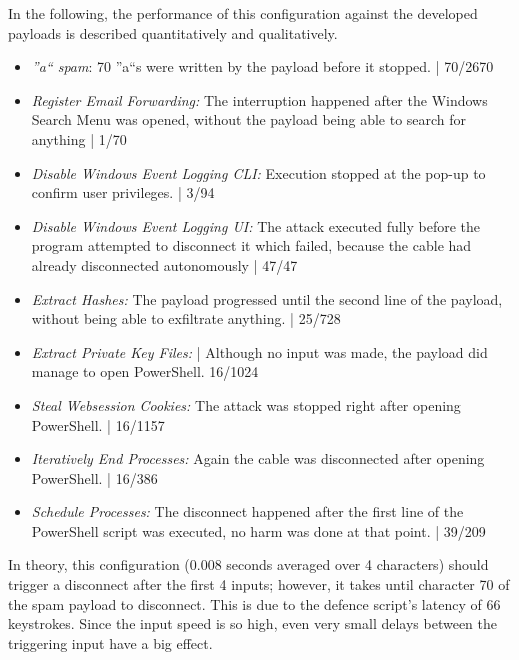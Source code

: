 In the following, the performance of this configuration against the developed payloads is described quantitatively and qualitatively.

\begin{itemize}
    \item  \emph{''a`` spam}: 70 ''a``s were written by the payload before it stopped. | 70/2670
    \item  \emph{Register Email Forwarding:} The interruption happened after the Windows Search Menu was opened, without the payload being able to search for anything  |  1/70 
    \item  \emph{Disable Windows Event Logging CLI:}  Execution stopped at the pop-up to confirm user privileges. | 3/94
    \item  \emph{Disable Windows Event Logging UI:} The attack executed fully before the program attempted to disconnect it which failed, because the cable had already disconnected autonomously | 47/47
    \item  \emph{Extract Hashes:}  The payload progressed until the second line of the payload, without being able to exfiltrate anything. | 25/728 
    \item  \emph{Extract Private Key Files:}  | Although no input was made, the payload did manage to open PowerShell. 16/1024
    \item  \emph{Steal Websession Cookies:} The attack was stopped right after opening PowerShell. | 16/1157
    \item  \emph{Iteratively End Processes:} Again the cable was disconnected after opening PowerShell. | 16/386
    \item  \emph{Schedule Processes:} The disconnect happened after the first line of the PowerShell script was executed, no harm was done at that point. | 39/209
\end{itemize}

In theory, this configuration (0.008 seconds averaged over 4 characters) should trigger a disconnect after the first 4 inputs; however, it takes until character 70 of the spam payload to disconnect. This is due to the defence script's latency of 66 keystrokes. Since the input speed is so high, even very small delays between the triggering input have a big effect.


